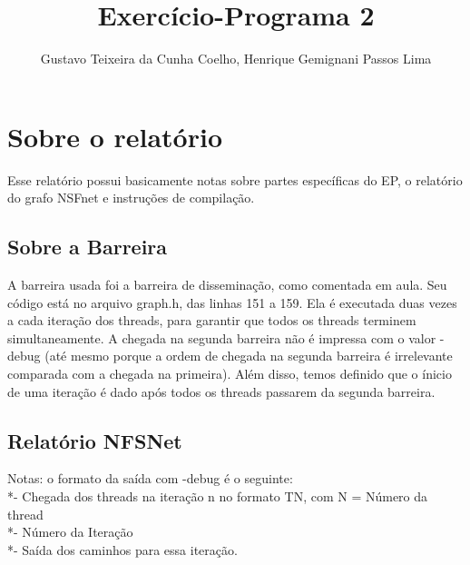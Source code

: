\documentclass[11pt]{article} %
\title{Exercício-Programa 2}
\author{Gustavo Teixeira da Cunha Coelho, Henrique Gemignani Passos Lima}
\begin{document}
\maketitle

\section{Sobre o relatório}

Esse relatório possui basicamente notas sobre partes específicas do EP, o relatório do grafo NSFnet e instruções de compilação.

\subsection{Sobre a Barreira}
A barreira usada foi a barreira de disseminação, como comentada em aula. Seu código está no arquivo graph.h, das linhas 151 a 159. Ela é executada duas vezes a cada iteração dos threads, para garantir que todos os threads terminem simultaneamente. A chegada na segunda barreira não é impressa com o valor -debug (até mesmo porque a ordem de chegada na segunda barreira é irrelevante comparada com a chegada na primeira). Além disso, temos definido que o ínicio de uma iteração é dado após todos os threads passarem da segunda barreira.

\subsection{Relatório NFSNet}
Notas: o formato da saída com -debug é o seguinte:
\\*- Chegada dos threads na iteração n no formato TN, com N = Número da thread
\\*- Número da Iteração
\\*- Saída dos caminhos para essa iteração.
\end{document}
